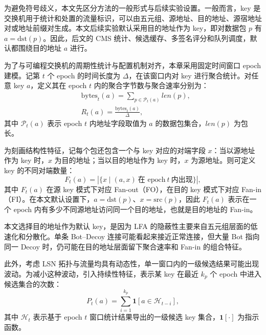 为避免符号歧义，本文先区分方法的一般形式与后续实验设置。一般而言，key 是交换机用于统计和处置的流量标识，可以由五元组、源地址、目的地址、源宿地址对或地址前缀对生成。本文后续实验默认采用目的地址作为 key，即对数据包 $p$ 有 $a=\mathrm{dst}(p)$。因此，后文的 CMS 统计、候选缓存、多签名评分和队列调度，默认都围绕目的地址 $a$ 进行。

为了与可编程交换机的周期性统计与配置机制对齐，本章采用固定时间窗口 epoch 建模。记第 $t$ 个 epoch 的时间长度为 $\Delta$，在该窗口内对 key 进行聚合统计。对任意 key $a$，定义其在 epoch $t$ 内的聚合字节数与聚合速率分别为：
\begin{subequations}\label{eq:rate_def}
\begin{align}
&\text{bytes}_t(a) = \sum_{p\in \mathcal{P}_t(a)} len(p),
\label{eq:rate_def_bytes}\\[0.35em]
&R_t(a) = \frac{\text{bytes}_t(a)}{\Delta},
\label{eq:rate_def_rate}
\end{align}
\end{subequations}
其中 $\mathcal{P}_t(a)$ 表示 epoch $t$ 内地址字段取值为 $a$ 的数据包集合，$len(p)$ 为包长。

为刻画结构性特征，记每个包还包含一个与 key 对应的对端字段 $x$：当以源地址作为 key 时，$x$ 为目的地址；当以目的地址作为 key 时，$x$ 为源地址。则可定义 key 的不同对端数量：
\begin{equation}
F_t(a)=\left|\{x \mid (a,x)\ \text{在 epoch}\ t\ \text{内出现}\}\right|,
\label{eq:fan_def}
\end{equation}
其中 $F_t(a)$ 在源 key 模式下对应 Fan-out（FO），在目的 key 模式下对应 Fan-in（FI）。在本文默认设置下，$a=\mathrm{dst}(p)$、$x=\mathrm{src}(p)$，因此 $F_t(a)$ 表示在一个 epoch 内有多少不同源地址访问同一个目的地址，也就是目的地址的 Fan-in。

本文选择目的地址作为默认 key，是因为 LFA 的隐蔽性主要来自五元组层面的低速化和分散化。单条 Bot--Decoy 连接可能看起来接近正常连接，但大量 Bot 指向同一 Decoy 时，仍可能在目的地址层面留下聚合速率和 Fan-in 的组合特征。

此外，考虑 LSN 拓扑与流量均具有动态性，单一窗口内的一级候选结果可能出现波动。为减小这种波动，引入持续性特征，表示某 key 在最近 $k_p$ 个 epoch 中进入候选集合的次数：
\begin{equation}
P_t(a)=\sum_{i=1}^{k_p}\mathbf{1}\left[a\in \mathcal{H}_{t-i}\right],
\label{eq:persist_def}
\end{equation}
其中 $\mathcal{H}_{t}$ 表示基于 epoch $t$ 窗口统计结果导出的一级候选 key 集合，$\mathbf{1}[\cdot]$ 为指示函数。

